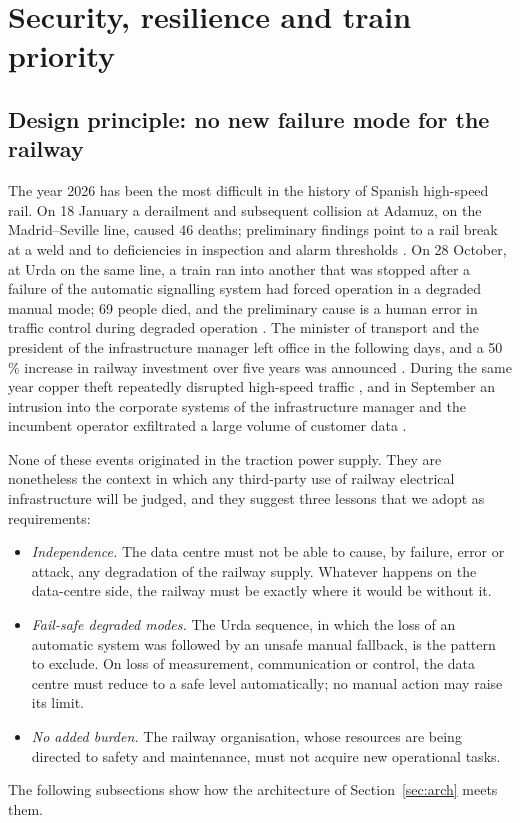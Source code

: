 \section{Security, resilience and train priority}
\label{sec:security}

\subsection{Design principle: no new failure mode for the railway}

The year 2026 has been the most difficult in the history of Spanish high-speed rail. On 18 January a derailment and subsequent collision at Adamuz, on the Madrid--Seville line, caused 46 deaths; preliminary findings point to a rail break at a weld and to deficiencies in inspection and alarm thresholds \cite{adamuz2026}. On 28 October, at Urda on the same line, a train ran into another that was stopped after a failure of the automatic signalling system had forced operation in a degraded manual mode; 69 people died, and the preliminary cause is a human error in traffic control during degraded operation \cite{urda2026}. The minister of transport and the president of the infrastructure manager left office in the following days, and a 50\,\% increase in railway investment over five years was announced \cite{infobae2026}. During the same year copper theft repeatedly disrupted high-speed traffic \cite{cable2026}, and in September an intrusion into the corporate systems of the infrastructure manager and the incumbent operator exfiltrated a large volume of customer data \cite{cyber2026}.

None of these events originated in the traction power supply. They are nonetheless the context in which any third-party use of railway electrical infrastructure will be judged, and they suggest three lessons that we adopt as requirements:
\begin{itemize}
\item[R1] \emph{Independence.} The data centre must not be able to cause, by failure, error or attack, any degradation of the railway supply. Whatever happens on the data-centre side, the railway must be exactly where it would be without it.
\item[R2] \emph{Fail-safe degraded modes.} The Urda sequence, in which the loss of an automatic system was followed by an unsafe manual fallback, is the pattern to exclude. On loss of measurement, communication or control, the data centre must reduce to a safe level automatically; no manual action may raise its limit.
\item[R3] \emph{No added burden.} The railway organisation, whose resources are being directed to safety and maintenance, must not acquire new operational tasks.
\end{itemize}
The following subsections show how the architecture of Section~\ref{sec:arch} meets them.

